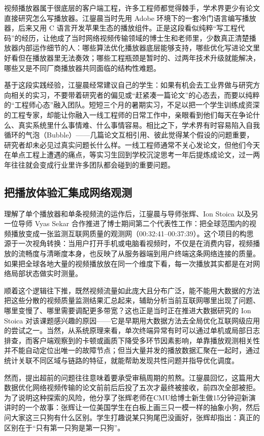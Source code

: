 \documentclass[UTF8,a4paper,11pt,fontset=fandol]{ctexart}
\begin{document}
视频播放器属于很底层的客户端工程，许多工程师都觉得棘手，学术界更少有论文直接研究怎么写播放器。江鋆晨当时先用 Adobe 环境下的一套冷门语言编写播放器，后来又用 C 语言开发苹果生态的播放组件。正是这段看似纯粹“写工程代码”的经历，让他成了当时网络视频传输领域的博士生和老师里，少数真正清楚播放器内部运作细节的人：哪些算法优化播放器底层能够支持，哪些优化写进论文里好看但在播放器里无法奏效；哪些工程瓶颈是暂时的、过两年技术升级就能解决，哪些又是不同厂商播放器共同面临的结构性难题。

基于这段实践经验，江鋆晨经常建议自己的学生：如果有机会去工业界做与研究方向相关的实习，不要带着研究者的偏见或“赶紧凑一篇论文”的心态去，而要以纯粹的“工程师心态”融入团队。短短三个月的暑期实习，不足以把一个学生训练成资深的工程专家，却能让你融入一线工程师的日常工作中，亲眼看到他们每天在争论什么、真实系统里什么事情难、什么事情容易。相比之下，学术界有时容易陷入自我循环的气泡（Bubble）——几篇论文互相引用、彼此觉得某个假设的问题重要，研究者却未必见过真实问题长什么样。一线工程师通常不关心发论文，但他们今天在单点工程上遭遇的痛点，等实习生回到学校沉淀思考一年后提炼成论文，过一两年往往就会变成行业里许多团队都会碰到的重要问题。

\subsection{把播放体验汇集成网络观测}
理解了单个播放器和单条视频流的运作后，江鋆晨与导师张辉、Ion Stoica 以及另一位导师 Vyas Sekar 合作推进了博士期间第二个代表性工作：把全球范围内的视频播放变成一张监测互联网质量的观测网（00:32:41–00:37:39）。这个项目的构思源于一次视角转换：当用户打开手机或电脑看视频时，不仅是在消费内容，视频播放的流畅度与清晰度本身，也反映了从服务器端到用户终端这条网络连接的质量。如果把全球各地大量的视频播放放在同一个维度下看，每一次播放其实都是在对网络局部状态做实时测量。

顺着这个逻辑往下推，既然视频流量如此庞大且分布广泛，能不能用大数据的方法把这些分散的视频质量监测结果汇总起来，辅助分析当前互联网哪里出现了问题、哪里变慢了、哪里需要调配更多带宽？这也正是当时正在推进大数据研究的 Ion Stoica 对该课题感兴趣的原因——它是早期用大数据方法去全局优化互联网级应用的尝试之一。当然，从系统原理来看，单次终端异常有时可以通过单机或局部日志排查，而客户端观察到的卡顿或画质下降受多环节因素影响，单靠播放观测相关性并不能自动定位出唯一的故障节点；但当大量并发的播放数据汇聚在一起时，通过统计关联不同区域与链路的特征，就能帮助发现共性问题并指导优化调度。

然而，提出超前的问题往往意味着要承受审稿周期的煎熬。江鋆晨回忆，这篇用大数据优化网络视频传输的论文前前后后投了五次才最终被接收，前四次全部被拒。为了说明这种探索的风险，他分享了张辉老师在CMU给博士新生做15分钟迎新演讲时的一个故事：张辉让一位美国学生在白板上画三只一模一样的抽象小狗，然后问大家这三只狗有什么区别。学生打趣说某只狗尾巴没画好，张辉却指出：真正的区别在于“只有第一只狗是第一只狗”。
\end{document}
